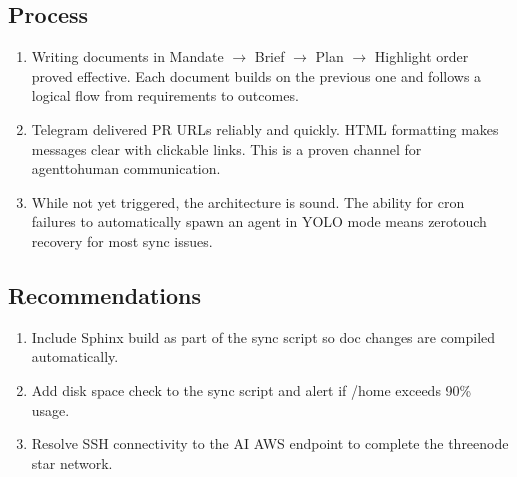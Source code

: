 \documentclass[letterpaper,10pt,openany,oneside,english]{sphinxmanual}
\begin{document}
\subsection{Process}
\label{\detokenize{lessons_learned:process}}\begin{enumerate}
%
\setcounter{enumi}{4}
\item {} 
\sphinxAtStartPar
{} \textendash{} Writing documents in Mandate \(\rightarrow\) Brief \(\rightarrow\) Plan \(\rightarrow\)
Highlight order proved effective. Each document builds on the previous
one and follows a logical flow from requirements to outcomes.

\item {} 
\sphinxAtStartPar
{} \textendash{} Telegram delivered PR URLs reliably
and quickly. HTML formatting makes messages clear with clickable links.
This is a proven channel for agent\sphinxhyphen{}to\sphinxhyphen{}human communication.

\item {} 
\sphinxAtStartPar
{} \textendash{} While not yet triggered, the architecture is
sound. The ability for cron failures to automatically spawn an agent
in YOLO mode means zero\sphinxhyphen{}touch recovery for most sync issues.

\end{enumerate}


\subsection{Recommendations}
\label{\detokenize{lessons_learned:recommendations}}\begin{enumerate}
%
\setcounter{enumi}{7}
\item {} 
\sphinxAtStartPar
{} \textendash{} Include Sphinx build as part of the sync
script so doc changes are compiled automatically.

\item {} 
\sphinxAtStartPar
{} \textendash{} Add disk space check to the sync script and
alert if /home exceeds 90\% usage.

\item {} 
\sphinxAtStartPar
{} \textendash{} Resolve SSH connectivity to the AI AWS endpoint
to complete the three\sphinxhyphen{}node star network.

\end{enumerate}
\end{document}
